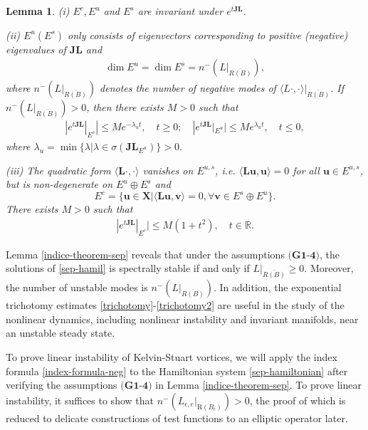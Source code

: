 \documentclass[1 [leqno, 11pt]{amsart}
\numberwithin{equation}{section}
\let\ep=\epsilon
\newtheorem{lemma}[Theorem]{Lemma}
\begin{document}
\begin{CJK*}{GBK}{song}
\begin{lemma}
{\rm(i)} $E^c, E^u$ and $ E^s$ are invariant under $e^{t\mathbf{JL}}$.

{\rm(ii)} $E^u (E^s)$ only consists of eigenvectors corresponding to positive (negative) eigenvalues of $\mathbf{JL}$ and
\begin{align}\label{index-formula-neg}
\dim E^u = \dim E^s = n^-\left(L|_{\overline{R(B)}} \right),
\end{align}
where $n^-\left(L|_{\overline{R(B)}} \right)$ denotes the number of negative modes of $\langle L\cdot, \cdot \rangle|_{{\overline{R(B)}} }$. If $n^-\left(L|_{\overline{R(B)}} \right) >0$, then there exists $M>0$ such that
\begin{align}\label{trichotomy}
|e^{t\mathbf{JL}}|_{E^s}| \leq Me^{-\lambda_ut},\quad t \geq 0; \quad |e^{t\mathbf{JL}}|_{E^u}| \leq Me^{\lambda_ut},\quad t \leq 0,
\end{align}
where $\lambda_u = \min \{ \lambda | \lambda \in \sigma(\mathbf{JL}_{E^u}) \} > 0.$

{\rm(iii)} The quadratic form $\langle \mathbf{L}\cdot, \cdot \rangle$ vanishes on $E^{u,s}$, i.e. $\langle \mathbf{L}\mathbf{u}, \mathbf{u} \rangle = 0$ for all $\mathbf{u} \in E^{u,s}$, but is non-degenerate on $E^u \oplus E^s$ and
$$E^c = \{ \mathbf{u} \in \mathbf{X} | \langle \mathbf{L}\mathbf{u}, \mathbf{v} \rangle = 0, \forall \mathbf{v} \in E^s \oplus E^u \}.$$
There exists $M > 0$ such that
\begin{align}\label{trichotomy2}|e^{t\mathbf{JL}}|_{E^c} | \leq M(1+t^2), \quad   t \in \mathbb{R}.\end{align}
\end{lemma}



Lemma \ref{indice-theorem-sep} reveals that under the assumptions $\textbf{(G1-4)}$, the solutions of \eqref{sep-hamil} is spectrally stable if and only if $ L|_{{\overline{R(B)}} }\geq0$. Moreover,  the number of unstable modes is  $n^-\left(L|_{\overline{R(B)}} \right)$. In addition, the exponential trichotomy estimates \eqref{trichotomy}-\eqref{trichotomy2} are useful in the  study of the nonlinear dynamics, including nonlinear instability and invariant manifolds, near an unstable steady state.



To prove  linear instability of Kelvin-Stuart vortices,
 we will apply the index formula \eqref{index-formula-neg} to the Hamiltonian system \eqref{sep-hamiltonian}  after verifying the assumptions $\textbf{(G1-4)}$ in Lemma \ref{indice-theorem-sep}.
To prove linear instability,
 it suffices to show that  $n^-\left(L_{\ep,e}|_{\overline{\text{R}(B_\ep)}}\right)>0$, the proof of which  is reduced to delicate constructions of test functions to an elliptic operator later.


\end{CJK*}
\end{document}
